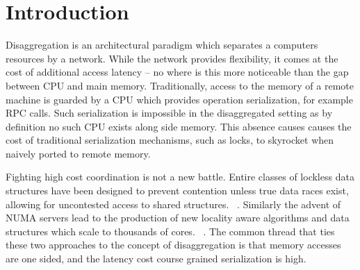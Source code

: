 

%




\section{Introduction}

Disaggregation is an architectural paradigm which separates a computers
resources by a network. While the network provides flexibility, it comes at the
cost of additional access latency
-- no where is this more noticeable than the gap between CPU and main memory.
Traditionally, access to the memory of a remote machine is guarded by a CPU
which provides operation serialization, for example RPC calls.  Such
serialization is impossible in the disaggregated setting as by definition no
such CPU exists along side memory. This absence causes causes the cost of
traditional serialization mechanisms, such as locks, to skyrocket when naively
ported to remote memory.

Fighting high cost coordination is not a new battle. Entire classes of lockless
data structures have been designed to prevent contention unless true data races
exist, allowing for uncontested access to shared structures.
~\cite{simple-fast,lock-free-skip,non-block-binary,read-concur-btree,lock-free-btree}.
Similarly the advent of NUMA servers lead to the production of new locality
aware algorithms and data structures which scale to thousands of cores.
~\cite{linux-scale,black-box-numa}. The common thread
that ties these two approaches to the concept of disaggregation is that memory
accesses are one sided, and the latency cost course grained serialization is
high.


